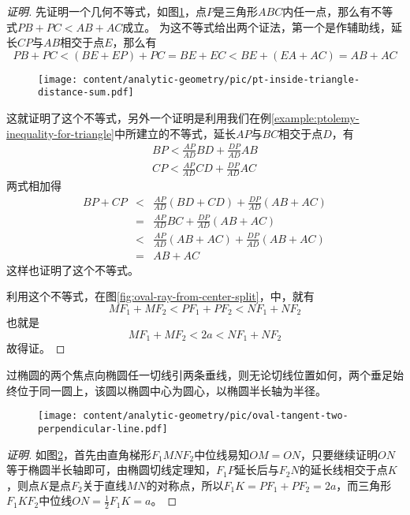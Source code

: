 \begin{proof}[证明]
  先证明一个几何不等式，如图\ref{fig:pt-inside-triangle-distance-sum}，点$P$是三角形$ABC$内任一点，那么有不等式$PB+PC<AB+AC$成立。
  为这不等式给出两个证法，第一个是作辅助线，延长$CP$与$AB$相交于点$E$，那么有
  \begin{equation*}
    PB+PC < (BE + EP) + PC = BE + EC < BE + (EA + AC) = AB + AC
  \end{equation*}

\begin{figure}[htbp]
  \centering
\texttt{[image: content/analytic-geometry/pic/pt-inside-triangle-distance-sum.pdf]}
\caption{}
\label{fig:pt-inside-triangle-distance-sum}
\end{figure}

这就证明了这个不等式，另外一个证明是利用我们在例\ref{example:ptolemy-inequality-for-triangle}中所建立的不等式，延长$AP$与$BC$相交于点$D$，有
\begin{eqnarray*}
  BP < \frac{AP}{AD} BD + \frac{DP}{AD} AB \\
  CP < \frac{AP}{AD} CD + \frac{DP}{AD} AC 
\end{eqnarray*}
两式相加得
\begin{eqnarray*}
  BP + CP & < & \frac{AP}{AD} (BD+CD) + \frac{DP}{AD} (AB+AC) \\
  & = & \frac{AP}{AD} BC + \frac{DP}{AD} (AB+AC) \\
  & < & \frac{AP}{AD} (AB+AC) + \frac{DP}{AD} (AB+AC) \\
  & = & AB+AC
\end{eqnarray*}
这样也证明了这个不等式。

利用这个不等式，在图\ref{fig:oval-ray-from-center-split}，中，就有
\begin{equation*}
  MF_1 + MF_2 < PF_1 + PF_2 < NF_1 + NF_2
\end{equation*}
  也就是
  \begin{equation*}
    MF_1 + MF_2 < 2a < NF_1 + NF_2
  \end{equation*}
  故得证。
\end{proof}

\begin{property}
 过椭圆的两个焦点向椭圆任一切线引两条垂线，则无论切线位置如何，两个垂足始终位于同一圆上，该圆以椭圆中心为圆心，以椭圆半长轴为半径。 
\end{property}

\begin{figure}[htbp]
  \centering
\texttt{[image: content/analytic-geometry/pic/oval-tangent-two-perpendicular-line.pdf]}
\caption{}
\label{fig:oval-tangent-two-perpendicular-line}
\end{figure}

\begin{proof}[证明]
  如图\ref{fig:oval-tangent-two-perpendicular-line}，首先由直角梯形$F_1MNF_2$中位线易知$OM=ON$，只要继续证明$ON$等于椭圆半长轴即可，由椭圆切线定理知，$F_1P$延长后与$F_2N$的延长线相交于点$K$，则点$K$是点$F_2$关于直线$MN$的对称点，所以$F_1K=PF_1+PF_2=2a$，而三角形$F_1KF_2$中位线$ON=\frac{1}{2}F_1K=a$。
\end{proof}



